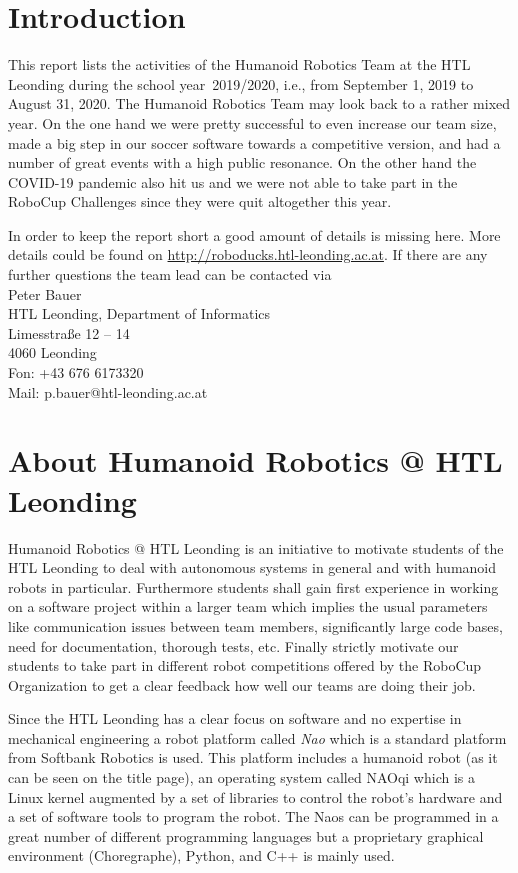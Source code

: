 \documentclass[11pt]{article}
\begin{document}
\tableofcontents
\newpage

\section{Introduction}
This report lists the activities of the Humanoid Robotics Team at the HTL Leonding during the school year~2019/2020, i.e., from September 1, 2019 to August 31, 2020. The Humanoid Robotics Team may look back to a rather mixed year. On the one hand we were pretty successful to even increase our team size, made a big step in our soccer software towards a competitive version, and had a number of great events with a high public resonance. On the other hand the COVID-19 pandemic also hit us and we were not able to take part in the RoboCup Challenges since they were quit altogether this year.

In order to keep the report short a good amount of details is missing here. More details could be found on \url{http://roboducks.htl-leonding.ac.at}. If there are any further questions the team lead can be contacted via \\[1em]
Peter Bauer\\
HTL Leonding, Department of Informatics\\
Limesstraße 12 -- 14\\
4060 Leonding\\
Fon: +43 676 6173320\\
Mail: p.bauer@htl-leonding.ac.at

\section{About Humanoid Robotics @ HTL Leonding}\label{sec:about}
Humanoid Robotics @ HTL Leonding is an initiative to motivate students of the HTL Leonding to deal with autonomous systems in general and with humanoid robots in particular. Furthermore students shall gain first experience in working on a software project within a larger team which implies the usual parameters like communication issues between team members, significantly large code bases, need for documentation, thorough tests, etc. Finally strictly motivate our students to take part in different robot competitions offered by the RoboCup Organization to get a clear feedback how well our teams are doing their job.

Since the HTL Leonding has a clear focus on software and no expertise in mechanical engineering a robot platform called {\em Nao} which is a standard platform from Softbank Robotics is used. This platform includes a humanoid robot (as it can be seen on the title page), an operating system called NAOqi which is a Linux kernel augmented by a set of libraries to control the robot's hardware and a set of software tools to program the robot. The Naos can be programmed in a great number of different programming languages but a proprietary graphical environment (Choregraphe), Python, and  C++ is mainly used.
\end{document}
